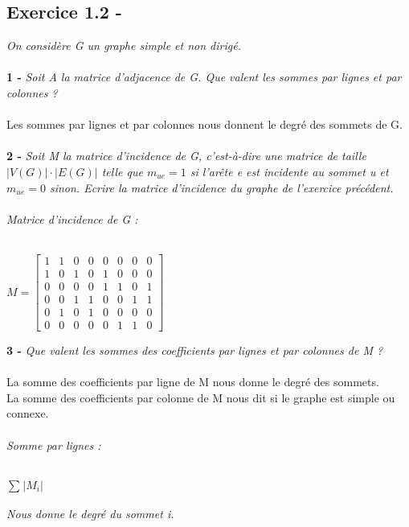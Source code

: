 \documentclass{article}
\begin{document}
\subsection*{Exercice 1.2 -}
\textit{On considère G un graphe simple et non dirigé.}\\\\
\textbf{1 -}
\textit{Soit A la matrice d'adjacence de G. Que valent les sommes par lignes et par colonnes ?}\\\\
\textsf{Les sommes par lignes et par colonnes nous donnent le degré des sommets de G.}\\\\
\textbf{2 -}
\textit{Soit M la matrice d’incidence de G, c’est-à-dire une matrice de taille $\big|V(G)\big| \cdot \big|E(G)\big|$ telle que $m_{ue} = 1$ si l’arête e est incidente au sommet u et $m_{ue} = 0$ sinon. Ecrire la matrice d’incidence du graphe de l’exercice précédent.}\\\\
\textit{Matrice d'incidence de G :}\\\\
\begin{center}
	$
	M =
	\left[\begin{matrix}
	1&1&0&0&0&0&0&0\\
	1&0&1&0&1&0&0&0\\
	0&0&0&0&1&1&0&1\\
	0&0&1&1&0&0&1&1\\
	0&1&0&1&0&0&0&0\\
	0&0&0&0&0&1&1&0
	\end{matrix}\right]
	$
\end{center}
\textbf{3 -}
\textit{Que valent les sommes des coefficients par lignes et par colonnes de M ?}\\\\
\textsf{La somme des coefficients par ligne de M nous donne le degré des sommets.}\\
\textsf{La somme des coefficients par colonne de M nous dit si le graphe est simple ou connexe.}\\\\
\textit{Somme par lignes :}\\\\
\begin{center}
$\sum_{}\big|M_{i}\big|$\\
\end{center}
\textit{Nous donne le degré du sommet i.}\\\\
\end{document}
